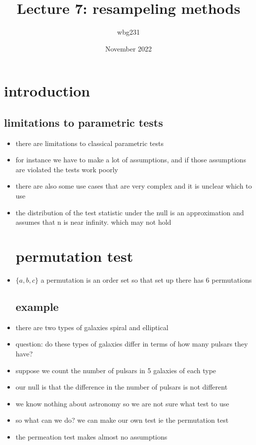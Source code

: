 \documentclass{article}
\title{Lecture 7: resampeling methods }
\author{wbg231 }
\date{November 2022}
\begin{document}
\maketitle

\section{introduction}
\subsection{limitations to parametric tests}
\begin{itemize}
\item there are limitations to classical parametric tests 
\item for instance we have to make a lot of assumptions, and if those assumptions are violated the tests work poorly
\item there are also some use cases that are very complex and it is unclear which to use
\item the distribution of the test statistic under the null is an approximation and assumes that n is near infinity. which may not hold
\section{permutation test}
\item $\{a,b,c\}$ a permutation is an order set so that set up there has 6 permutations 
\subsection{example}
\item there are two types of galaxies spiral and elliptical 
\item question: do these types of galaxies differ in terms of how many pulsars they have? 
\item suppose we count the number of pulsars in 5 galaxies of each type 
\item our null is that  the difference in the number of pulsars is not different 
\item we know nothing about astronomy so we are not sure what test to use
\item so what can we do? we can make our own test ie the permutation test
\item the permeation test makes almost no assumptions

\end{itemize}
\end{document}
